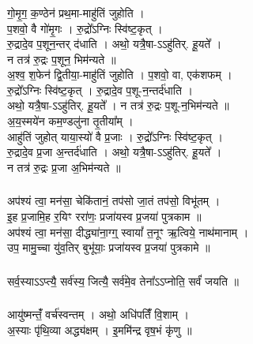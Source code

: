 \subsubsection{}
गो॒मृ॒ग॒ क॒ण्ठेन॑ प्रथ॒मा-माहु॑तिं जुहोति ।\\
प॒शवो॒ वै गो॑मृ॒गः । रु॒द्रो᳚ऽग्निः स्वि॑ष्ट॒कृत् ।\\
रु॒द्रादे॒व प॒शून॒न्तर् द॑धाति । अथो॒ यत्रै॒षा-ऽऽहु॑तिर्. हू॒यते᳚ ।\\
न तत्र॑ रु॒द्रः प॒शून॒ भिम॑न्यते ॥\\
अ॒श्व॒ श॒फेन॑ द्वि॒तीया॒-माहु॑तिं जुहोति । प॒शवो॒ वा, एक॑शफम् ।\\
रु॒द्रो᳚ऽग्निः स्वि॑ष्ट॒कृत् । रु॒द्रादे॒व प॒शू-न॒न्तर्द॑धाति ।\\
अथो॒ यत्रै॒षा-ऽऽहु॑तिर्. हू॒यते᳚ । न तत्र॑ रु॒द्रः प॒शू-न॒भिम॑न्यते ॥\\
अ॒य॒स्मये॑न कम॒ण्डलु॑ना तृ॒तीया᳚म् ।\\
आहु॑तिं जुहोत् याया॒स्यो॑ वै प्र॒जाः । रु॒द्रो᳚ऽग्निः स्वि॑ष्ट॒कृत् ।\\
रु॒द्रादे॒व प्र॒जा अ॒न्तर्द॑धाति । अथो॒ यत्रै॒षा-ऽऽहु॑तिर्. हू॒यते᳚ ।\\
न तत्र॑ रु॒द्रः प्र॒जा अ॒भिम॑न्यते ॥\\
\subsubsection{}
अप॑श्यं त्वा॒ मन॑सा॒ चेकि॑तानं॒ तप॑सो जा॒तं तप॑सो॒ विभू॑तम् ।\\
इ॒ह प्र॒जामि॒ह र॒यिꣳ ररा॑णः॒ प्रजा॑यस्व प्र॒जया॑ पुत्रकाम ॥\\
अप॑श्यं त्वा॒ मन॑सा॒ दीद्ध्या॑ना॒ग्ग्॒ स्वायां᳚ त॒नूꣳ ऋ॒त्विये॒ नाथ॑मानाम् ।\\
उप॒ मामु॒च्चा यु॑व॒तिर् बुभू॑याः॒ प्रजा॑यस्व प्र॒जया॑ पुत्रकामे ॥\\
\subsubsection{}
सर्व॒स्याऽऽप्त्यै॒ सर्व॑स्य॒ जित्यै॒ सर्व॑मे॒व तेना᳚ऽऽप्नोति॒ सर्वं॑ जयति ॥\\
\subsubsection{}
आयु॑ष्मन्तंँ॒ वर्च॑स्वन्तम् । अथो॒ अधि॑पतिंँ वि॒शाम् ।\\
अ॒स्याः पृ॑थि॒व्या अद्ध्य॑क्षम् । इ॒ममि॑न्द्र वृष॒भं कृ॑णु ॥\\
